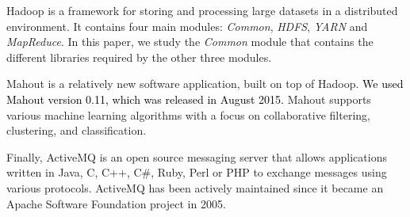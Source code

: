\documentclass[times, doublespace]{smrauth}
\newcommand{\red}[1]{\textcolor{black}{#1}}
\begin{document}
{Hadoop \cite{hadoop2011hadoop} is a framework for storing and processing large datasets in a distributed environment. It contains four main modules: {\it Common}, {\it HDFS}, {\it YARN} and {\it MapReduce}. In this paper, we study the {\it Common} module that contains the different libraries required by the other three modules.

Mahout \cite{mahout2012scalable} is a relatively new software application, built on top of Hadoop. \red{We used Mahout version 0.11, which was released in August 2015.}
Mahout supports various machine learning algorithms with a focus on collaborative filtering, clustering, and classification.

Finally, ActiveMQ \cite{snyder2011activemq} is an open source messaging server that allows applications written in Java, C, C++, C\#, Ruby, Perl or PHP to exchange messages using various protocols. ActiveMQ has  been actively maintained since it became an Apache Software Foundation project in 2005.


}
\end{document}
